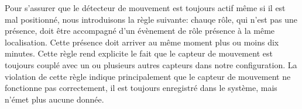 
Pour s'assurer que le détecteur de mouvement est toujours actif même si il est mal positionné, nous introduisons la règle suivante: chauqe rôle, qui n'est pas une présence, doit être accompagné d'un évènement de rôle présence à la même localisation. Cette présence doit arriver au même moment plus ou moins dix minutes. Cette règle rend explicite le fait que le capteur de mouvement est toujours couplé avec un ou plusieurs autres capteurs dans notre configuration. La violation de cette règle indique principalement que le capteur de mouvement ne fonctionne pas correctement, il est toujours enregistré dans le système, mais n'émet plus aucune donnée.


